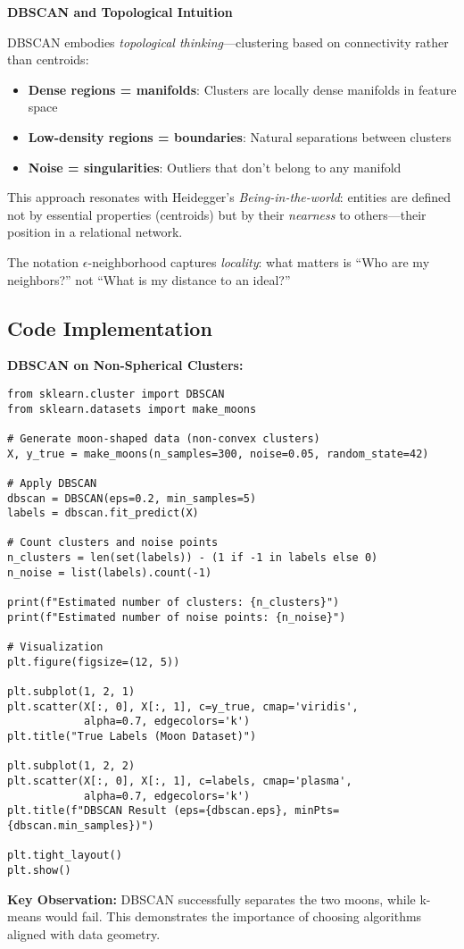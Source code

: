 \begin{philobox}
\textbf{DBSCAN and Topological Intuition}

DBSCAN embodies \textit{topological thinking}---clustering based on connectivity rather than centroids:

\begin{itemize}
    \item \textbf{Dense regions = manifolds}: Clusters are locally dense manifolds in feature space
    \item \textbf{Low-density regions = boundaries}: Natural separations between clusters
    \item \textbf{Noise = singularities}: Outliers that don't belong to any manifold
\end{itemize}

This approach resonates with Heidegger's \textit{Being-in-the-world}: entities are defined not by essential properties (centroids) but by their \textit{nearness} to others---their position in a relational network.

The notation $\epsilon$-neighborhood captures \textit{locality}: what matters is ``Who are my neighbors?'' not ``What is my distance to an ideal?''
\end{philobox}

\subsection{Code Implementation}

\begin{codebox}
\textbf{DBSCAN on Non-Spherical Clusters:}

\begin{lstlisting}
from sklearn.cluster import DBSCAN
from sklearn.datasets import make_moons

# Generate moon-shaped data (non-convex clusters)
X, y_true = make_moons(n_samples=300, noise=0.05, random_state=42)

# Apply DBSCAN
dbscan = DBSCAN(eps=0.2, min_samples=5)
labels = dbscan.fit_predict(X)

# Count clusters and noise points
n_clusters = len(set(labels)) - (1 if -1 in labels else 0)
n_noise = list(labels).count(-1)

print(f"Estimated number of clusters: {n_clusters}")
print(f"Estimated number of noise points: {n_noise}")

# Visualization
plt.figure(figsize=(12, 5))

plt.subplot(1, 2, 1)
plt.scatter(X[:, 0], X[:, 1], c=y_true, cmap='viridis', 
            alpha=0.7, edgecolors='k')
plt.title("True Labels (Moon Dataset)")

plt.subplot(1, 2, 2)
plt.scatter(X[:, 0], X[:, 1], c=labels, cmap='plasma', 
            alpha=0.7, edgecolors='k')
plt.title(f"DBSCAN Result (eps={dbscan.eps}, minPts={dbscan.min_samples})")

plt.tight_layout()
plt.show()
\end{lstlisting}

\textbf{Key Observation:} DBSCAN successfully separates the two moons, while k-means would fail. This demonstrates the importance of choosing algorithms aligned with data geometry.
\end{codebox}


